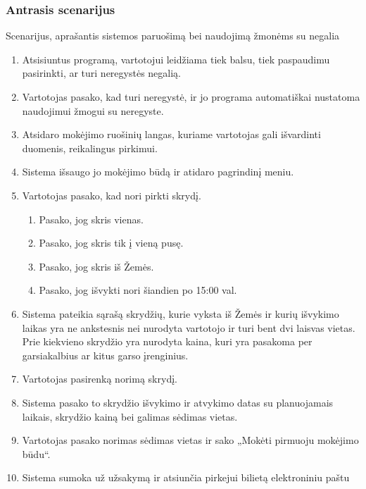 \documentclass{VUMIFPSkursinis}
\begin{document}
\subsubsection{Antrasis scenarijus}
Scenarijus, aprašantis sistemos paruošimą bei naudojimą žmonėms su negalia
\begin{enumerate}
\item Atsisiuntus programą, vartotojui leidžiama tiek balsu, tiek paspaudimu pasirinkti, ar turi neregystės negalią.
\item Vartotojas pasako, kad turi neregystė, ir jo programa automatiškai nustatoma naudojimui žmogui su neregyste.
\item Atsidaro mokėjimo ruošinių langas, kuriame vartotojas gali išvardinti duomenis, reikalingus pirkimui.
\item Sistema išsaugo jo mokėjimo būdą ir atidaro pagrindinį meniu.
\item Vartotojas pasako, kad nori pirkti skrydį.
\begin{enumerate}[label*=\arabic*.]
\item Pasako, jog skris vienas.
\item Pasako, jog skris tik į vieną pusę.
\item Pasako, jog skris iš Žemės.
\item Pasako, jog išvykti nori šiandien po 15:00 val.
\end{enumerate}
\item Sistema pateikia sąrašą skrydžių, kurie vyksta iš Žemės ir kurių išvykimo laikas yra ne ankstesnis nei nurodyta vartotojo ir turi bent dvi laisvas vietas. Prie kiekvieno skrydžio yra nurodyta kaina, kuri yra pasakoma per garsiakalbius ar kitus garso įrenginius.
\item Vartotojas pasirenką norimą skrydį.
\item Sistema pasako to skrydžio išvykimo ir atvykimo datas su planuojamais laikais, skrydžio kainą bei galimas sėdimas vietas.
\item Vartotojas pasako norimas sėdimas vietas ir sako „Mokėti pirmuoju mokėjimo būdu“.
\item Sistema sumoka už užsakymą ir atsiunčia pirkejui bilietą elektroniniu paštu
\end{enumerate}
\end{document}
